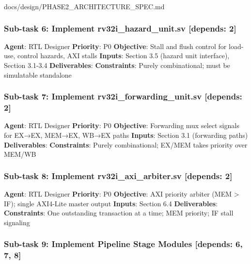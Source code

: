 \begin{relocated}{docs/design/PHASE2_ARCHITECTURE_SPEC.md}
\subsubsection{\texorpdfstring{Sub-task 6: Implement
rv32i\_\allowbreak{}hazard\_\allowbreak{}unit.sv {[}depends:
2{]}}{Sub-task 6: Implement rv32i\_hazard\_unit.sv {[}depends: 2{]}}}\label{ds:ch:phase2-architecture:sub-task-6-implement-rv32i-hazard-unitsv-depends-2}

\textbf{Agent}: RTL Designer \textbf{Priority}: P0 \textbf{Objective}:
Stall and flush control for load-use, control hazards, AXI stalls
\textbf{Inputs}: Section 3.5 (hazard unit interface), Section 3.1-3.4
\textbf{Deliverables}: 
\textbf{Constraints}: Purely combinational; must be simulatable
standalone

\subsubsection{\texorpdfstring{Sub-task 7: Implement
rv32i\_\allowbreak{}forwarding\_\allowbreak{}unit.sv {[}depends:
2{]}}{Sub-task 7: Implement rv32i\_forwarding\_unit.sv {[}depends: 2{]}}}\label{ds:ch:phase2-architecture:sub-task-7-implement-rv32i-forwarding-unitsv-depends-2}

\textbf{Agent}: RTL Designer \textbf{Priority}: P0 \textbf{Objective}:
Forwarding mux select signals for EX→EX, MEM→EX, WB→EX paths
\textbf{Inputs}: Section 3.1 (forwarding paths) \textbf{Deliverables}:
 \textbf{Constraints}: Purely
combinational; EX/MEM takes priority over MEM/WB

\subsubsection{\texorpdfstring{Sub-task 8: Implement
rv32i\_\allowbreak{}axi\_\allowbreak{}arbiter.sv {[}depends:
2{]}}{Sub-task 8: Implement rv32i\_axi\_arbiter.sv {[}depends: 2{]}}}\label{ds:ch:phase2-architecture:sub-task-8-implement-rv32i-axi-arbitersv-depends-2}

\textbf{Agent}: RTL Designer \textbf{Priority}: P0 \textbf{Objective}:
AXI priority arbiter (MEM \textgreater{} IF); single AXI4-Lite master
output \textbf{Inputs}: Section 6.4 \textbf{Deliverables}:
 \textbf{Constraints}: One outstanding
transaction at a time; MEM priority; IF stall signaling

\subsubsection{Sub-task 9: Implement Pipeline Stage Modules {[}depends:
6, 7, 8{]}}\label{ds:ch:phase2-architecture:sub-task-9-implement-pipeline-stage-modules-depends-6-7-8}


\end{relocated}

